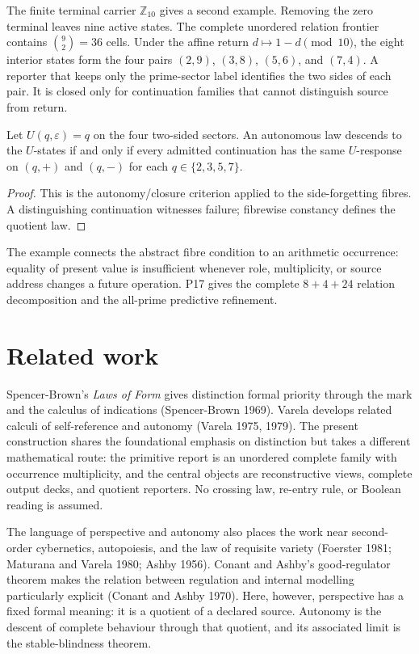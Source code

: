 \documentclass[11pt,a4paper]{article}
\begin{document}
The finite terminal carrier $\mathbb Z_{10}$ gives a second example. Removing the zero terminal leaves nine active states. The complete unordered relation frontier contains $\binom92=36$ cells. Under the affine return $d\mapsto1-d\pmod {10}$, the eight interior states form the four pairs $(2,9)$, $(3,8)$, $(5,6)$, and $(7,4)$. A reporter that keeps only the prime-sector label identifies the two sides of each pair. It is closed only for continuation families that cannot distinguish source from return.

\begin{proposition}
Let $U(q,\varepsilon)=q$ on the four two-sided sectors. An autonomous law descends to the $U$-states if and only if every admitted continuation has the same $U$-response on $(q,+)$ and $(q,-)$ for each $q\in\{2,3,5,7\}$.
\end{proposition}
\begin{proof}
This is the autonomy/closure criterion applied to the side-forgetting fibres. A distinguishing continuation witnesses failure; fibrewise constancy defines the quotient law.
\end{proof}

The example connects the abstract fibre condition to an arithmetic occurrence: equality of present value is insufficient whenever role, multiplicity, or source address changes a future operation. P17 gives the complete $8+4+24$ relation decomposition and the all-prime predictive refinement.

\section{Related work}

Spencer-Brown's \emph{Laws of Form} gives distinction formal priority
through the mark and the calculus of indications (Spencer-Brown 1969).
Varela develops related calculi of self-reference and autonomy (Varela
1975, 1979). The present construction shares the foundational emphasis
on distinction but takes a different mathematical route: the primitive
report is an unordered complete family with occurrence multiplicity, and
the central objects are reconstructive views, complete output decks, and
quotient reporters. No crossing law, re-entry rule, or Boolean reading
is assumed.

The language of perspective and autonomy also places the work near
second-order cybernetics, autopoiesis, and the law of requisite variety
(Foerster 1981; Maturana and Varela 1980; Ashby 1956). Conant and
Ashby's good-regulator theorem makes the relation between regulation and
internal modelling particularly explicit (Conant and Ashby 1970). Here,
however, perspective has a fixed formal meaning: it is a quotient of a
declared source. Autonomy is the descent of complete behaviour through
that quotient, and its associated limit is the stable-blindness theorem.
\end{document}
